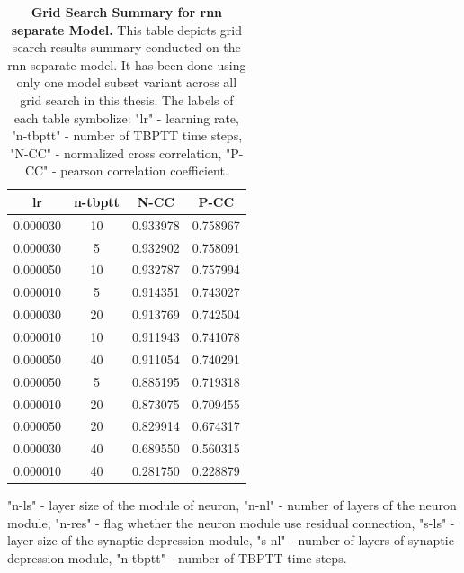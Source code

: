\begin{table}
    \centering\footnotesize\sf
    \begin{tabular}{cccc}
    \toprule
    lr & n-tbptt & N-CC & P-CC \\
    \midrule
    0.000030 & 10 & 0.933978 & 0.758967 \\
    0.000030 & 5 & 0.932902 & 0.758091 \\
    0.000050 & 10 & 0.932787 & 0.757994 \\
    0.000010 & 5 & 0.914351 & 0.743027 \\
    0.000030 & 20 & 0.913769 & 0.742504 \\
    0.000010 & 10 & 0.911943 & 0.741078 \\
    0.000050 & 40 & 0.911054 & 0.740291 \\
    0.000050 & 5 & 0.885195 & 0.719318 \\
    0.000010 & 20 & 0.873075 & 0.709455 \\
    0.000050 & 20 & 0.829914 & 0.674317 \\
    0.000030 & 40 & 0.689550 & 0.560315 \\
    0.000010 & 40 & 0.281750 & 0.228879 \\
    \bottomrule
    \end{tabular}
    \caption{\textbf{Grid Search Summary for rnn separate Model.} This table depicts grid search results summary conducted on the rnn separate model. It has been done using only one model subset variant across all grid search in this thesis. The labels of each table symbolize: "lr" - learning rate, "n-tbptt" - number of TBPTT time steps, "N-CC" - normalized cross correlation, "P-CC" - pearson correlation coefficient.}
    \label{tab:grid_rnn_separate}
\end{table}

"n-ls" - layer size of the module of neuron, "n-nl" - number of layers of the neuron module, "n-res" - flag whether the neuron module use residual connection, "s-ls" - layer size of the synaptic depression module, "s-nl" - number of layers of synaptic depression module, "n-tbptt" - number of TBPTT time steps.

